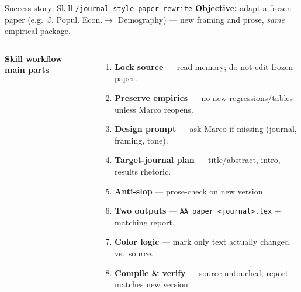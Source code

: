 \begin{frame}[t]{Success story: Skill \texttt{/journal-style-paper-rewrite}}
  \footnotesize
  \textbf{Objective:} adapt a frozen paper (e.g.\ J. Popul. Econ.$\rightarrow$ Demography) --- new framing and prose, \emph{same} empirical package.
  \vspace{0.15cm}
  \begin{columns}[T,onlytextwidth]
      \textbf{Skill workflow --- main parts}
      \begin{enumerate}\setlength\itemsep{0.16em}
        \item \textbf{Lock source} --- read memory; \alert{do not edit frozen paper}.
        \item \textbf{Preserve empirics} --- no new regressions/tables unless Marco reopens.
        \item \textbf{Design prompt} --- \alert{ask Marco if missing} (journal, framing, tone).
        \item \textbf{Target-journal plan} --- title/abstract, intro, results rhetoric.
        \item \textbf{Anti-slop} --- prose-check on new version.
        \item \textbf{Two outputs} --- \texttt{AA\_paper\_<journal>.tex} + matching report.
        \item \textbf{Color logic} --- mark only text actually changed vs.\ source.
        \item \textbf{Compile \& verify} --- source untouched; report matches new version.
      \end{enumerate}
     
  \end{columns}
\end{frame}
